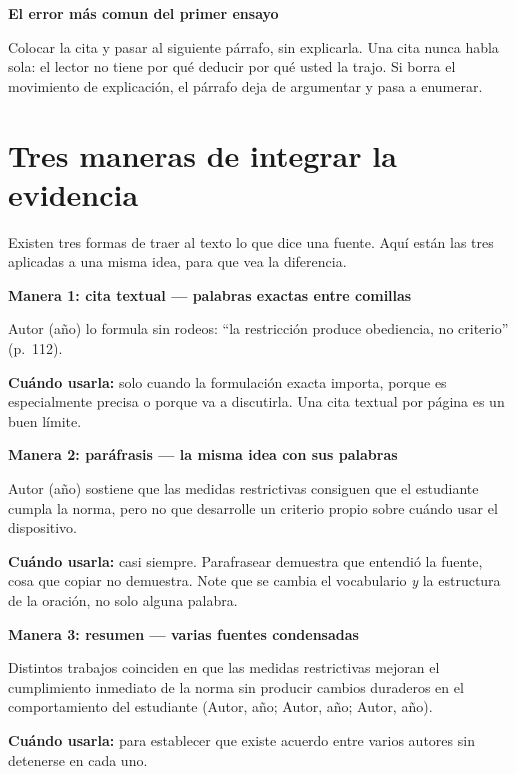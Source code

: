 \documentclass[12pt,a4paper,openany]{report}
\newenvironment{ejemplo}[1]
	{\begin{lrbox}{\cajaguardada}\begin{minipage}{\dimexpr\textwidth-2\fboxsep\relax}\vspace{4pt}\textcolor{verdeejemplo}{\textbf{\sffamily\small #1}}\par\vspace{3pt}\small}
	{\vspace{4pt}\end{minipage}\end{lrbox}\par\vspace{4pt}\noindent\colorbox{cremaejemplo}{\usebox{\cajaguardada}}\par\vspace{8pt}}
\newenvironment{aviso}[1]
	{\begin{lrbox}{\cajaguardada}\begin{minipage}{\dimexpr\textwidth-2\fboxsep\relax}\vspace{4pt}\textbf{\sffamily\small #1}\par\vspace{3pt}\small}
	{\vspace{4pt}\end{minipage}\end{lrbox}\par\vspace{4pt}\noindent\colorbox{grisclaro}{\usebox{\cajaguardada}}\par\vspace{8pt}}
\begin{document}
\begin{aviso}{El error m\'as comun del primer ensayo}
Colocar la cita y pasar al siguiente p\'arrafo, sin explicarla. Una cita nunca habla sola: el lector no tiene por qu\'e deducir por qu\'e usted la trajo. Si borra el movimiento de explicaci\'on, el p\'arrafo deja de argumentar y pasa a enumerar.
\end{aviso}

\section{Tres maneras de integrar la evidencia}

Existen tres formas de traer al texto lo que dice una fuente. Aqu\'i est\'an las tres aplicadas a una misma idea, para que vea la diferencia.

\begin{ejemplo}{Manera 1: cita textual --- palabras exactas entre comillas}
Autor (a\~no) lo formula sin rodeos: ``la restricci\'on produce obediencia, no criterio'' (p.~112).

\textbf{Cu\'ando usarla:} solo cuando la formulaci\'on exacta importa, porque es especialmente precisa o porque va a discutirla. Una cita textual por p\'agina es un buen l\'imite.
\end{ejemplo}

\begin{ejemplo}{Manera 2: par\'afrasis --- la misma idea con sus palabras}
Autor (a\~no) sostiene que las medidas restrictivas consiguen que el estudiante cumpla la norma, pero no que desarrolle un criterio propio sobre cu\'ando usar el dispositivo.

\textbf{Cu\'ando usarla:} casi siempre. Parafrasear demuestra que entendi\'o la fuente, cosa que copiar no demuestra. Note que se cambia el vocabulario \emph{y} la estructura de la oraci\'on, no solo alguna palabra.
\end{ejemplo}

\begin{ejemplo}{Manera 3: resumen --- varias fuentes condensadas}
Distintos trabajos coinciden en que las medidas restrictivas mejoran el cumplimiento inmediato de la norma sin producir cambios duraderos en el comportamiento del estudiante (Autor, a\~no; Autor, a\~no; Autor, a\~no).

\textbf{Cu\'ando usarla:} para establecer que existe acuerdo entre varios autores sin detenerse en cada uno.
\end{ejemplo}
\end{document}
